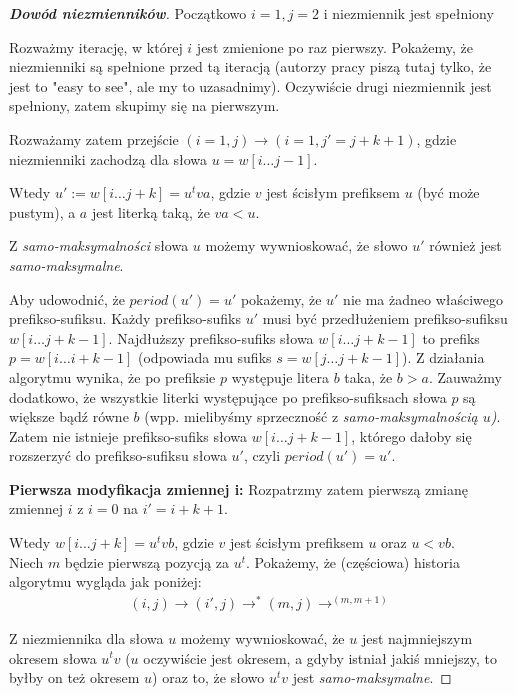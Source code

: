 \documentclass{article}
\begin{document}
\begin{proof}[\textbf{Dowód niezmienników}]
Początkowo $i = 1, j = 2$ i niezmiennik jest spełniony

Rozważmy iterację, w której $i$ jest zmienione po raz pierwszy. Pokażemy, że niezmienniki są spełnione przed tą iteracją 
(autorzy pracy piszą tutaj tylko, że jest to "easy to see", ale my to uzasadnimy). Oczywiście drugi niezmiennik jest spełniony, zatem skupimy się na pierwszym.

Rozważamy zatem przejście $(i=1, j) \rightarrow (i=1, j' = j + k + 1)$, gdzie niezmienniki zachodzą dla słowa $u = w[i \ldots j-1]$.

Wtedy $u' := w[i\ldots j + k] = u^tva$, gdzie $v$ jest ścisłym prefiksem $u$ (być może pustym), a $a$ jest literką taką, że $va < u$.

Z \textit{samo-maksymalności} słowa $u$ możemy wywnioskować, że słowo $u'$ również jest \textit{samo-maksymalne}. 

Aby udowodnić, że $period(u') = u'$ pokażemy, że $u'$ nie ma żadneo właściwego prefikso-sufiksu. 
Każdy prefikso-sufiks $u'$ musi być przedłużeniem prefikso-sufiksu $w[i\ldots j+k-1]$. 
Najdłuższy prefikso-sufiks słowa $w[i\ldots j+k-1]$ to prefiks $p = w[i\ldots i+k-1]$ (odpowiada mu sufiks $s = w[j\ldots j+k-1]$).
Z działania algorytmu wynika, że po prefiksie $p$ występuje litera $b$ taka, że $b > a$. 
Zauważmy dodatkowo, że wszystkie literki występujące po prefikso-sufiksach słowa $p$ są większe bądź równe $b$ (wpp. mielibyśmy sprzeczność z \textit{samo-maksymalnością $u$)}.
Zatem nie istnieje prefikso-sufiks słowa $w[i\ldots j+k-1]$, którego dałoby się rozszerzyć do prefikso-sufiksu słowa $u'$, czyli $period(u') = u'$.

\vspace{5pt}

\textbf{Pierwsza modyfikacja zmiennej i:} Rozpatrzmy zatem pierwszą zmianę zmiennej $i$ z $i=0$ na $i' = i + k + 1$. 

Wtedy $w[i\ldots j+k] = u^t vb$, gdzie $v$ jest ścisłym prefiksem $u$ oraz $u < vb$.\\
Niech $m$ będzie pierwszą pozycją za $u^t$. Pokażemy, że (częściowa) historia algorytmu wygląda jak poniżej:
\begin{align*}
    (i, j) \rightarrow (i', j) \rightarrow^{*} (m, j) \rightarrow^(m, m+1)
\end{align*}

Z niezmiennika dla słowa $u$ możemy wywnioskować, że $u$ jest najmniejszym okresem słowa $u^tv$ ($u$ oczywiście jest okresem, a gdyby istniał jakiś mniejszy, to byłby on też okresem $u$) 
oraz to, że słowo $u^tv$ jest \textit{samo-maksymalne}. 


\end{proof}
\end{document}
